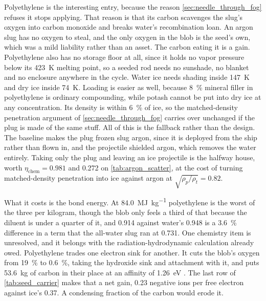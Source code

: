 \documentclass{article}
\begin{document}
Polyethylene is the interesting entry, because the reason \autoref{sec:needle_through_fog} refuses it stops applying. That reason is that its carbon scavenges the slug's oxygen into carbon monoxide and breaks water's recombination loan. An argon slug has no oxygen to steal, and the only oxygen in the blob is the seed's own, which was a mild liability rather than an asset. The carbon eating it is a gain. Polyethylene also has no storage floor at all, since it holds no vapor pressure below its \SI{423}{\kelvin} melting point, so a seeded rod needs no sunshade, no blanket and no enclosure anywhere in the cycle. Water ice needs shading inside \SI{147}{\kelvin} and dry ice inside \SI{74}{\kelvin}. Loading is easier as well, because \SI{8}{\percent} mineral filler in polyethylene is ordinary compounding, while potash cannot be put into dry ice at any concentration. Its density is within \SI{6}{\percent} of ice, so the matched-density penetration argument of \autoref{sec:needle_through_fog} carries over unchanged if the plug is made of the same stuff. All of this is the fallback rather than the design. The baseline makes the plug frozen slug argon, since it is deployed from the ship rather than flown in, and the projectile shielded argon, which removes the water entirely. Taking only the plug and leaving an ice projectile is the halfway house, worth $\eta_{\mathrm{chem}} = \num{0.981}$ and \num{0.272} on \autoref{tab:argon_scatter}, at the cost of turning matched-density penetration into ice against argon at $\sqrt{\rho_p/\rho_t} = 0.82$.

What it costs is the bond energy. At \SI{84.0}{\mega\joule\per\kilogram} polyethylene is the worst of the three per kilogram, though the blob only feels a third of that because the diluent is under a quarter of it, and \num{0.914} against water's \num{0.948} is a \SI{3.6}{\percent} difference in a term that the all-water slug ran at \num{0.731}. One chemistry item is unresolved, and it belongs with the radiation-hydrodynamic calculation already owed. Polyethylene trades one electron sink for another. It cuts the blob's oxygen from \SI{19}{\percent} to \SI{0.6}{\percent}, taking the hydroxide sink and  attachment with it, and puts \SI{53.6}{\kilogram} of carbon in their place at an affinity of \SI{1.26}{\electronvolt} \cite{crc_handbook}. The last row of \autoref{tab:seed_carrier} makes that a net gain, \num{0.23} negative ions per free electron against ice's \num{0.37}. A condensing fraction of the carbon would erode it.
\end{document}
